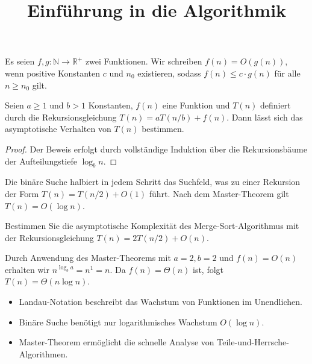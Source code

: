 \documentclass[mode=notes, palette=burgundy, lang=german, fontsize=11pt]{modernclassnotes}
\title{Einführung in die Algorithmik}
\begin{document}
\maketitle
\tableofcontents
\newpage


\begin{definition}
Es seien $f, g: \mathbb{N} \to \mathbb{R}^+$ zwei Funktionen. Wir schreiben $f(n) = O(g(n))$, wenn positive Konstanten $c$ und $n_0$ existieren, sodass $f(n) \le c \cdot g(n)$ für alle $n \ge n_0$ gilt.
\end{definition}

\begin{theorem}
Seien $a \ge 1$ und $b > 1$ Konstanten, $f(n)$ eine Funktion und $T(n)$ definiert durch die Rekursionsgleichung $T(n) = a T(n/b) + f(n)$. Dann lässt sich das asymptotische Verhalten von $T(n)$ bestimmen.
\end{theorem}

\begin{proof}
Der Beweis erfolgt durch vollständige Induktion über die Rekursionsbäume der Aufteilungstiefe $\log_b n$.
\end{proof}

\begin{example}
Die binäre Suche halbiert in jedem Schritt das Suchfeld, was zu einer Rekursion der Form $T(n) = T(n/2) + O(1)$ führt. Nach dem Master-Theorem gilt $T(n) = O(\log n)$.
\end{example}

\begin{exercise}[Laufzeitanalyse]
Bestimmen Sie die asymptotische Komplexität des Merge-Sort-Algorithmus mit der Rekursionsgleichung $T(n) = 2T(n/2) + O(n)$.
\end{exercise}

\begin{solution}
Durch Anwendung des Master-Theorems mit $a=2, b=2$ und $f(n)=O(n)$ erhalten wir $n^{\log_b a} = n^1 = n$. Da $f(n) = \Theta(n)$ ist, folgt $T(n) = \Theta(n \log n)$.
\end{solution}

\begin{takeaways}
\begin{itemize}
  \item Landau-Notation beschreibt das Wachstum von Funktionen im Unendlichen.
  \item Binäre Suche benötigt nur logarithmisches Wachstum $O(\log n)$.
  \item Master-Theorem ermöglicht die schnelle Analyse von Teile-und-Herrsche-Algorithmen.
\end{itemize}
\end{takeaways}
\end{document}
